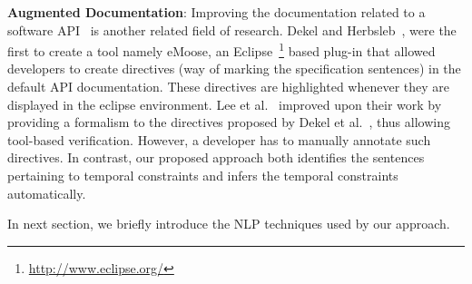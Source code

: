 \textbf{Augmented Documentation}:
Improving the documentation related to a software API~\cite{Dekel2009,tan2011acomment} is another related field of research.
Dekel and Herbsleb~\cite{Dekel2009}, were the first to create a tool namely eMoose,
an Eclipse~\footnote{\url{http://www.eclipse.org/}} based plug-in that allowed developers to create directives
(way of marking the specification sentences) in the default API documentation.
These directives are highlighted whenever they are displayed in the eclipse environment.
Lee et al.~\cite{lee2012towards} improved upon their work by providing a formalism to the directives proposed by Dekel et al.~\cite{Dekel2009},
thus allowing tool-based verification.
However, a developer has to manually annotate such directives.
In contrast, our proposed approach both identifies the sentences pertaining to temporal constraints and infers the temporal constraints automatically. 

In next section, we briefly introduce the NLP techniques used by our approach.
